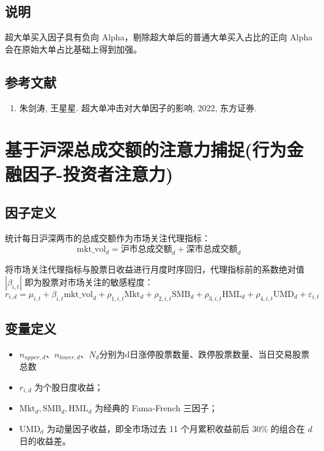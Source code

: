 \documentclass{article}
\begin{document}
\subsection{说明}
超大单买入因子具有负向 Alpha，剔除超大单后的普通大单买入占比的正向 Alpha 会在原始大单占比基础上得到加强。

\subsection{参考文献}
\begin{enumerate}
    \item 朱剑涛, 王星星. 超大单冲击对大单因子的影响, 2022, 东方证券.
\end{enumerate}

\section{基于沪深总成交额的注意力捕捉(行为金融因子-投资者注意力)}

\subsection{因子定义}

统计每日沪深两市的总成交额作为市场关注代理指标：
\begin{equation}
    \mathrm{mkt\_vol}_d = \text{沪市总成交额}_d + \text{深市总成交额}_d
\end{equation}

将市场关注代理指标与股票日收益进行月度时序回归，代理指标前的系数绝对值 \( |\beta_{i,t}| \) 即为股票对市场关注的敏感程度：
\begin{equation}
    r_{i,d} = \mu_{i,t} + \beta_{i,t} \mathrm{mkt\_vol}_d + \rho_{1,i,t} \mathrm{Mkt}_d + \rho_{2,i,t} \mathrm{SMB}_d + \rho_{3,i,t} \mathrm{HML}_d + \rho_{4,i,t} \mathrm{UMD}_d + \varepsilon_{i,t}
\end{equation}

\subsection{变量定义}
\begin{itemize}
    \item  \( n_{upper,d}、n_{lower,d}、N_d\)分别为d日涨停股票数量、跌停股票数量、当日交易股票总数
    \item  \( r_{i,d} \) 为个股日度收益；
    \item  \( \mathrm{Mkt}_d, \mathrm{SMB}_d, \mathrm{HML}_d \) 为经典的 Fama-French 三因子；
    \item  \( \mathrm{UMD}_d \) 为动量因子收益，即全市场过去 11 个月累积收益前后 30\% 的组合在 \( d \) 日的收益差。
\end{itemize}
\end{document}
